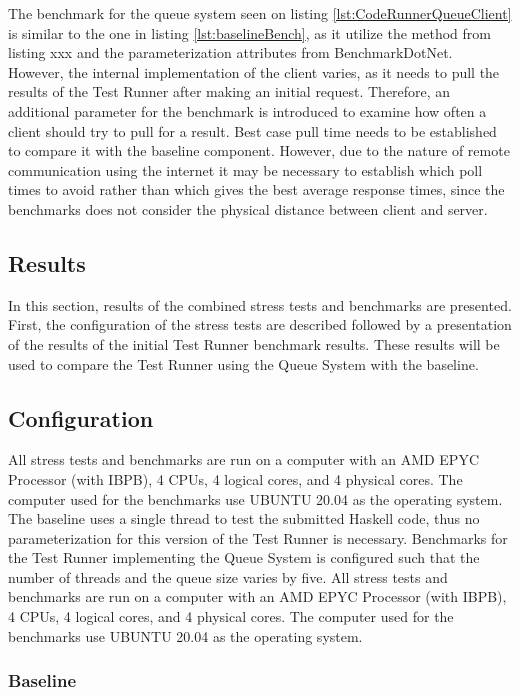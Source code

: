 The benchmark for the queue system seen on listing \ref{lst:CodeRunnerQueueClient} is similar to the one in listing \ref{lst:baselineBench}, as it utilize the method from listing xxx and the parameterization attributes from BenchmarkDotNet. However, the internal implementation of the client varies, as it needs to pull the results of the Test Runner after making an initial request. 
Therefore, an additional parameter for the benchmark is introduced to examine how often a client should try to pull for a result.
Best case pull time needs to be established to compare it with the baseline component. 
However, due to the nature of remote communication using the internet it may be necessary to establish which poll times to avoid rather than which gives the best average response times, since the benchmarks does not consider the physical distance between client and server.

\subsection{Results}
In this section, results of the combined stress tests and benchmarks are presented.
First, the configuration of the stress tests are described followed by a presentation of the results of the initial Test Runner benchmark results. These results will be used to compare the Test Runner using the Queue System with the baseline.  

\subsection{Configuration}
All stress tests and benchmarks are run on a computer with an AMD EPYC Processor (with IBPB), 4 CPUs, 4 logical cores, and 4 physical cores. The computer used for the benchmarks use UBUNTU 20.04 as the operating system.
The baseline uses a single thread to test the submitted Haskell code, thus no parameterization for this version of the Test Runner is necessary.
Benchmarks for the Test Runner implementing the Queue System is configured such that the number of threads and the queue size varies by five. 
All stress tests and benchmarks are run on a computer with an AMD EPYC Processor (with IBPB), 4 CPUs, 4 logical cores, and 4 physical cores. The computer used for the benchmarks use UBUNTU 20.04 as the operating system.

\subsubsection{Baseline}

